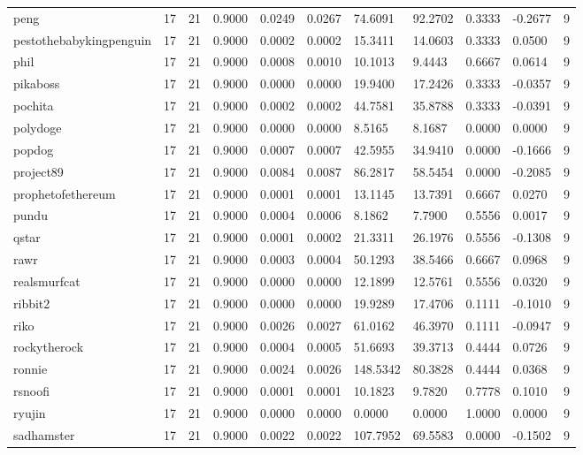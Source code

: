 \begin{table}[htbp]
\begin{tabular}{lllllllllll}
peng & 17 & 21 & 0.9000 & 0.0249 & 0.0267 & 74.6091 & 92.2702 & 0.3333 & -0.2677 & 9 \\
pestothebabykingpenguin & 17 & 21 & 0.9000 & 0.0002 & 0.0002 & 15.3411 & 14.0603 & 0.3333 & 0.0500 & 9 \\
phil & 17 & 21 & 0.9000 & 0.0008 & 0.0010 & 10.1013 & 9.4443 & 0.6667 & 0.0614 & 9 \\
pikaboss & 17 & 21 & 0.9000 & 0.0000 & 0.0000 & 19.9400 & 17.2426 & 0.3333 & -0.0357 & 9 \\
pochita & 17 & 21 & 0.9000 & 0.0002 & 0.0002 & 44.7581 & 35.8788 & 0.3333 & -0.0391 & 9 \\
polydoge & 17 & 21 & 0.9000 & 0.0000 & 0.0000 & 8.5165 & 8.1687 & 0.0000 & 0.0000 & 9 \\
popdog & 17 & 21 & 0.9000 & 0.0007 & 0.0007 & 42.5955 & 34.9410 & 0.0000 & -0.1666 & 9 \\
project89 & 17 & 21 & 0.9000 & 0.0084 & 0.0087 & 86.2817 & 58.5454 & 0.0000 & -0.2085 & 9 \\
prophetofethereum & 17 & 21 & 0.9000 & 0.0001 & 0.0001 & 13.1145 & 13.7391 & 0.6667 & 0.0270 & 9 \\
pundu & 17 & 21 & 0.9000 & 0.0004 & 0.0006 & 8.1862 & 7.7900 & 0.5556 & 0.0017 & 9 \\
qstar & 17 & 21 & 0.9000 & 0.0001 & 0.0002 & 21.3311 & 26.1976 & 0.5556 & -0.1308 & 9 \\
rawr & 17 & 21 & 0.9000 & 0.0003 & 0.0004 & 50.1293 & 38.5466 & 0.6667 & 0.0968 & 9 \\
realsmurfcat & 17 & 21 & 0.9000 & 0.0000 & 0.0000 & 12.1899 & 12.5761 & 0.5556 & 0.0320 & 9 \\
ribbit2 & 17 & 21 & 0.9000 & 0.0000 & 0.0000 & 19.9289 & 17.4706 & 0.1111 & -0.1010 & 9 \\
riko & 17 & 21 & 0.9000 & 0.0026 & 0.0027 & 61.0162 & 46.3970 & 0.1111 & -0.0947 & 9 \\
rockytherock & 17 & 21 & 0.9000 & 0.0004 & 0.0005 & 51.6693 & 39.3713 & 0.4444 & 0.0726 & 9 \\
ronnie & 17 & 21 & 0.9000 & 0.0024 & 0.0026 & 148.5342 & 80.3828 & 0.4444 & 0.0368 & 9 \\
rsnoofi & 17 & 21 & 0.9000 & 0.0001 & 0.0001 & 10.1823 & 9.7820 & 0.7778 & 0.1010 & 9 \\
ryujin & 17 & 21 & 0.9000 & 0.0000 & 0.0000 & 0.0000 & 0.0000 & 1.0000 & 0.0000 & 9 \\
sadhamster & 17 & 21 & 0.9000 & 0.0022 & 0.0022 & 107.7952 & 69.5583 & 0.0000 & -0.1502 & 9 \\

\end{tabular}
\end{table}
